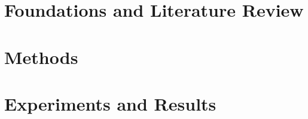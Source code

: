 \documentclass[ twoside,openright,titlepage,numbers=noenddot,headinclude,%
                footinclude=true,cleardoublepage=empty,abstractoff, %
                BCOR=5mm,paper=a4,fontsize=11pt,%
                ngerman,american,%
                ]{scrreprt}
\begin{document}
\frenchspacing
\raggedbottom
{} %
\pagestyle{plain}
%


\pagestyle{scrheadings}
\cleardoublepage
\cleardoublepage{}
\cleardoublepage 

\part{Foundations and Literature Review}

 
%





\cleardoublepage
\part{Methods}
 
 
\part{Experiments and Results} 
 
 
\end{document}

